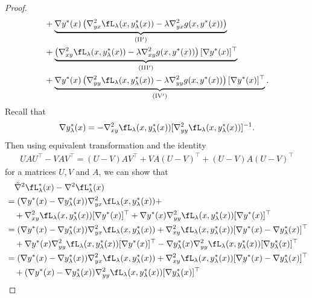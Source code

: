 \begin{proof}
\begin{align*}
    &+  \underbrace{\nabla y^*(x) \left(\nabla_{yx}^2 \fL_{\lambda}(x,y_{\lambda}^*(x))- \lambda \nabla_{yx}^2 g(x,y^*(x))\right) }_{\rm (II')}\\ 
    & + \underbrace{ \left(\nabla_{xy}^2 \fL_{\lambda}(x,y_{\lambda}^*(x))- \lambda \nabla_{xy}^2 g(x,y^*(x))\right)[\nabla y^*(x)]^\top }_{\rm (III')} \\
    &+ \underbrace{\nabla y^*(x) \left(\nabla_{yy}^2 \fL_{\lambda} (x,y_{\lambda}^*(x))   - \lambda \nabla_{yy}^2 g(x,y^*(x)) \right) [\nabla y^*(x)]^\top }_{\rm (IV')}. 
\end{align*}
Recall  that
\begin{align*}
    \nabla y_{\lambda}^*(x) = - \nabla_{xy}^2 \fL_{\lambda}(x,y_{\lambda}^*(x)) [\nabla_{yy}^2 \fL_{\lambda}(x,y_{\lambda}^*(x)) ]^{-1}.
\end{align*}
Then using
equivalent transformation and the identity
\begin{align*}
    U A U^\top - V A V^\top = (U-V) A V^\top + VA (U-V)^\top + (U-V)A (U-V)^\top
\end{align*}
for a matrices $U,V$ and $A$,
we can show that
\begin{align*}
    &\quad \tilde \nabla^2 \fL_{\lambda}^*(x) - \nabla^2 \fL_{\lambda}^*(x) \\
    &= ( \nabla y^*(x) - \nabla y_{\lambda}^*(x) ) \nabla_{yx}^2 \fL_{\lambda} (x,y_{\lambda}^*(x)) + \\
    &\quad + \nabla_{xy}^2 \fL_{\lambda}(x,y_{\lambda}^*(x)) [ \nabla y^*(x)]^\top + \nabla y^*(x) \nabla_{yy}^2 \fL_{\lambda} (x,y_{\lambda}^*(x)) [\nabla y^*(x)]^\top \\
    &= ( \nabla y^*(x) - \nabla y_{\lambda}^*(x) ) \nabla_{yx}^2 \fL_{\lambda} (x,y_{\lambda}^*(x)) + \nabla_{xy}^2 \fL_{\lambda}(x,y_{\lambda}^*(x)) [ \nabla y^*(x) - \nabla y_{\lambda}^*(x)]^\top \\
    &\quad + \nabla y^*(x) \nabla_{yy}^2 \fL_{\lambda} (x,y_{\lambda}^*(x)) [\nabla y^*(x)]^\top - \nabla y_{\lambda}^*(x) \nabla_{yy}^2 \fL_{\lambda} (x,y_{\lambda}^*(x)) [\nabla y_{\lambda}^*(x)]^\top \\
    &= ( \nabla y^*(x) - \nabla y_{\lambda}^*(x) ) \nabla_{yx}^2 \fL_{\lambda} (x,y_{\lambda}^*(x)) + \nabla_{xy}^2 \fL_{\lambda}(x,y_{\lambda}^*(x)) [ \nabla y^*(x) - \nabla y_{\lambda}^*(x)]^\top \\ 
    &\quad + (\nabla y^*(x) - \nabla y_{\lambda}^*(x)) \nabla_{yy}^2 \fL_{\lambda} (x,y_{\lambda}^*(x)) [ \nabla y_{\lambda}^*(x)]^\top \\

\end{align*}
\end{proof}
